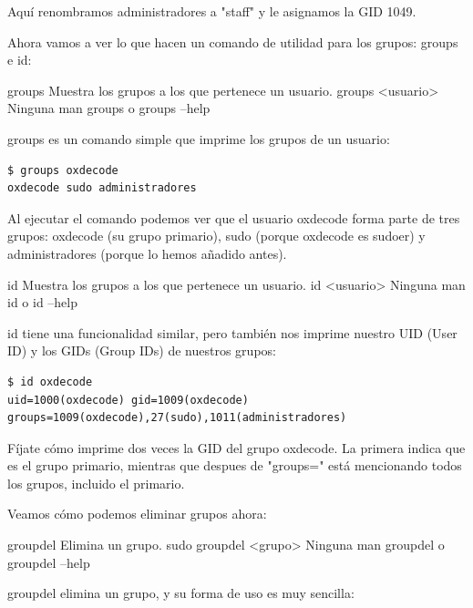 Aquí renombramos administradores a "staff" y le asignamos la GID 1049. 

Ahora vamos a ver lo que hacen un comando de utilidad para los grupos: groups e id:

\begin{command-info}
{groups}
{Muestra los grupos a los que pertenece un usuario.}
{groups <usuario>}
{Ninguna}
{man groups o groups --help}
\end{command-info}

groups es un comando simple que imprime los grupos de un usuario:

\begin{tcolorbox-code}
\begin{lstlisting}
$ groups oxdecode
oxdecode sudo administradores
\end{lstlisting}
\end{tcolorbox-code}

Al ejecutar el comando podemos ver que el usuario oxdecode forma parte de tres grupos: oxdecode (su grupo primario), sudo (porque oxdecode es sudoer) y administradores (porque lo hemos añadido antes).

\begin{command-info}
{id}
{Muestra los grupos a los que pertenece un usuario.}
{id <usuario>}
{Ninguna}
{man id o id --help}
\end{command-info}

id tiene una funcionalidad similar, pero también nos imprime nuestro UID (User ID) y los GIDs (Group IDs) de nuestros grupos:

\begin{tcolorbox-code}
\begin{lstlisting}
$ id oxdecode
uid=1000(oxdecode) gid=1009(oxdecode) groups=1009(oxdecode),27(sudo),1011(administradores)
\end{lstlisting}
\end{tcolorbox-code}

Fíjate cómo imprime dos veces la GID del grupo oxdecode. La primera indica que es el grupo primario, mientras que despues de "groups=" está mencionando todos los grupos, incluido el primario.

Veamos cómo podemos eliminar grupos ahora:

\begin{command-info}
{groupdel}
{Elimina un grupo.}
{sudo groupdel <grupo>}
{Ninguna}
{man groupdel o groupdel --help}
\end{command-info}

groupdel elimina un grupo, y su forma de uso es muy sencilla:

